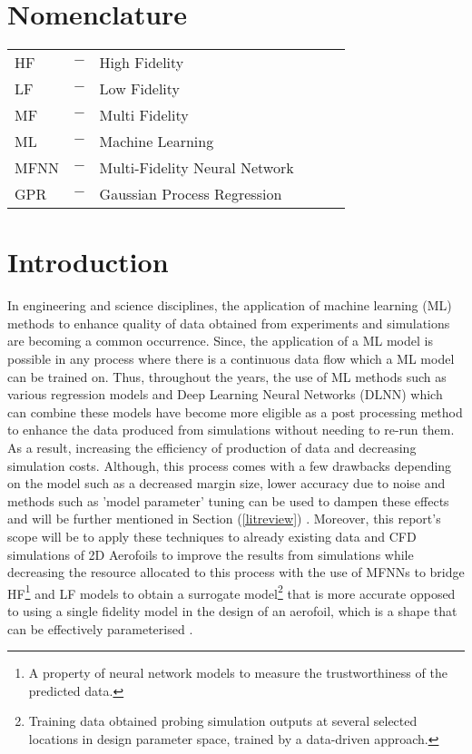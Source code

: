 \documentclass[12pt,letterpaper]{article}
\begin{document}


\newpage

\setlength{\parskip}{0.25em}    
\tableofcontents
\setlength{\parskip}{1.5em}  

\newpage
{}
\section*{Nomenclature}

\vspace{-1em}
\begin{tabular}{lcl lcl}
      HF & $-$ & High Fidelity \\
      LF & $-$ & Low Fidelity \\
      MF & $-$ & Multi Fidelity \\
      ML & $-$ & Machine Learning \\
      MFNN & $-$ & Multi-Fidelity Neural Network \\
      GPR & $-$ & Gaussian Process Regression
\end{tabular}

 
\newpage

\setcounter{page}{1}
\section{Introduction}
\vspace{-1.5em}
    In engineering and science disciplines, the application of machine learning (ML) methods to enhance quality of data obtained from experiments and simulations are becoming a common occurrence. Since, the application of a ML model is possible in any process where there is a continuous data flow which a ML model can be trained on. Thus, throughout the years, the use of ML methods such as various regression models and Deep Learning Neural Networks (DLNN) which can combine these models have become more eligible as a post processing method to enhance the data produced from simulations without needing to re-run them. As a result, increasing the efficiency of production of data and decreasing simulation costs. Although, this process comes with a few drawbacks depending on the model such as a decreased margin size, lower accuracy due to noise and methods such as 'model parameter' tuning can be used to dampen these effects and will be further mentioned in Section (\ref{litreview}) \parencite{Burkov.2019}. Moreover, this report's scope will be to apply these techniques to already existing data and CFD simulations of 2D Aerofoils to improve the results from simulations while decreasing the resource allocated to this process with the use of MFNNs to bridge HF\footnote{A property of neural network models to measure the trustworthiness of the predicted data.}  and LF models to obtain a surrogate model\footnote{Training data obtained probing simulation outputs at several selected locations in design parameter space, trained by a data-driven approach.}  that is more accurate opposed to using a single fidelity model in the design of an aerofoil, which is a shape that can be effectively parameterised \parencite{Mole.2022}.
\end{document}
